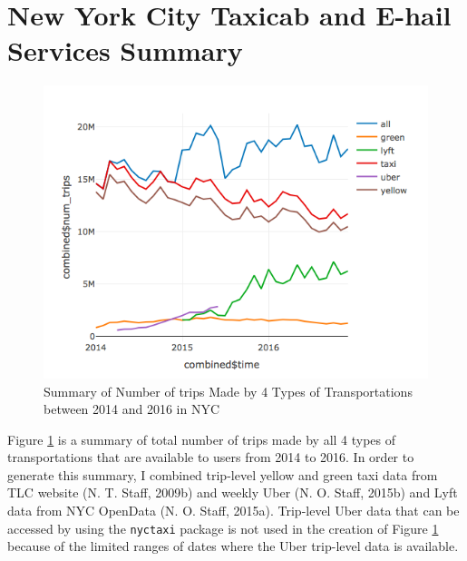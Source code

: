 \documentclass[12pt,twoside]{reedthesis}
\theoremstyle{definition}
\theoremstyle{definition}
\theoremstyle{definition}
\theoremstyle{remark}
\begin{document}
\section{New York City Taxicab and E-hail Services
Summary}\label{new-york-city-taxicab-and-e-hail-services-summary}
\begin{figure}[h]

{\centering \includegraphics[width=5.75in]{figure/Num_trips_summary} 

}

\caption{Summary of Number of trips Made by 4 Types of Transportations between 2014 and 2016 in NYC}\label{fig:num-trips-summary}
\end{figure}
Figure \ref{fig:num-trips-summary} is a summary of total number of trips
made by all 4 types of transportations that are available to users from
2014 to 2016. In order to generate this summary, I combined trip-level
yellow and green taxi data from TLC website (N. T. Staff, 2009b) and
weekly Uber (N. O. Staff, 2015b) and Lyft data from NYC OpenData (N. O.
Staff, 2015a). Trip-level Uber data that can be accessed by using the
\texttt{nyctaxi} package is not used in the creation of Figure
\ref{fig:num-trips-summary} because of the limited ranges of dates where
the Uber trip-level data is available.
\end{document}
